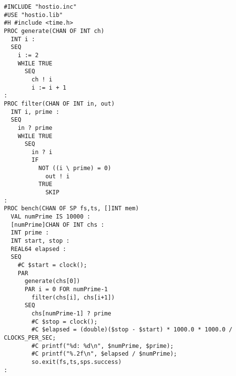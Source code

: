 \begin{lstlisting}[caption={Concurrent prime sieve code for occam},style={CustomOccam}]
#INCLUDE "hostio.inc"
#USE "hostio.lib"
#H #include <time.h>
PROC generate(CHAN OF INT ch)
  INT i :
  SEQ
    i := 2
    WHILE TRUE
      SEQ
        ch ! i
        i := i + 1
:
PROC filter(CHAN OF INT in, out)
  INT i, prime :
  SEQ
    in ? prime
    WHILE TRUE
      SEQ
        in ? i
        IF
          NOT ((i \ prime) = 0)
            out ! i
          TRUE
            SKIP
:
PROC bench(CHAN OF SP fs,ts, []INT mem)
  VAL numPrime IS 10000 :
  [numPrime]CHAN OF INT chs :
  INT prime :
  INT start, stop :
  REAL64 elapsed :
  SEQ
    #C $start = clock();
    PAR
      generate(chs[0])
      PAR i = 0 FOR numPrime-1
        filter(chs[i], chs[i+1])
      SEQ
        chs[numPrime-1] ? prime
        #C $stop = clock();
        #C $elapsed = (double)($stop - $start) * 1000.0 * 1000.0 / CLOCKS_PER_SEC;
        #C printf("%d: %d\n", $numPrime, $prime);
        #C printf("%.2f\n", $elapsed / $numPrime);
        so.exit(fs,ts,sps.success)
:

\end{lstlisting}

